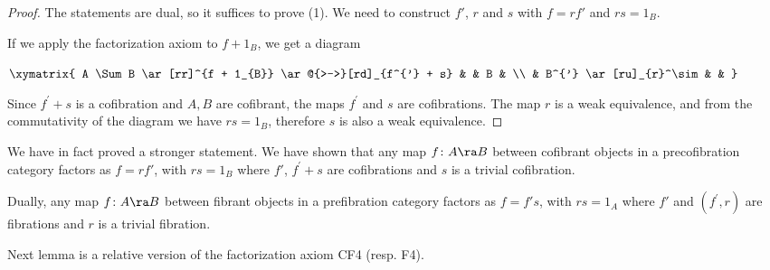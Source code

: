 \begin{proof}
The statements are dual, so it suffices to prove (1). We need to construct $f'$, $r$ and $s$ with $f = rf'$ and $rs = 1_B$. 

If we apply the factorization axiom to $f + 1_B$, we get a diagram
\begin{center}
$ \xymatrix {
        A \Sum B \ar[rr]^{f + 1_{B}} \ar@{>->}[rd]_{f^{'} + s} &  & B & \\
        & B^{'} \ar[ru]_{r}^\sim & &
	}$
\end{center}
Since $f^{'} + s$ is a cofibration and $A, B$ are cofibrant, the maps $f^{'}$  and $s$ are cofibrations. The map $r$ is a weak equivalence, and from the commutativity of the diagram we have $rs = 1_B$, therefore $s$ is also a weak equivalence.
\end{proof}

\begin{rem}
\label{rem:brownfact}
We have in fact proved a stronger statement. We have shown that any map $f \colon A \ra B$ between cofibrant objects in a precofibration category factors as $f = rf'$, with $rs = 1_B$ where $f'$, $f^{'} + s$ are cofibrations and $s$ is a trivial cofibration.

Dually, any map $f \colon A \ra B$ between fibrant objects in a prefibration category factors as $f = f's$, with $rs = 1_A$ where $f'$ and $(f^{'}, r)$ are fibrations and $r$ is a trivial fibration.
\end{rem}

Next lemma is a relative version of the factorization axiom CF4 (resp. F4). 

